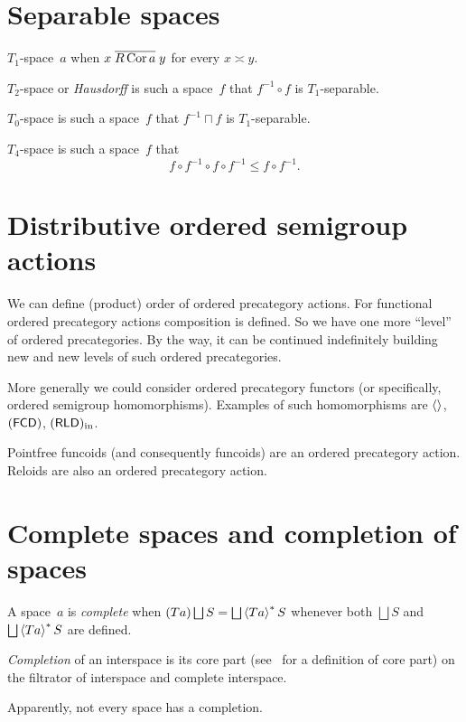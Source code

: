 \chapter{Separable spaces}

$T_1$-space~$a$ when $x\mathrel{\overline{R\operatorname{Cor} a}}y$ for every $x\asymp y$.

$T_2$-space or \emph{Hausdorff} is such a space~$f$ that $f^{-1}\circ f$ is $T_1$-separable.

$T_0$-space is such a space~$f$ that $f^{-1}\sqcap f$ is $T_1$-separable.

$T_4$-space is such a space~$f$ that \[ f\circ f^{-1}\circ f\circ f^{-1}\leq f\circ f^{-1}. \]

\chapter{Distributive ordered semigroup actions}

We can define (product) order of ordered precategory actions. For functional ordered precategory actions composition is defined. So we have one more ``level'' of ordered precategories. By the way, it can be continued indefinitely building new and new levels of such ordered precategories.

More generally we could consider ordered precategory functors (or specifically, ordered semigroup homomorphisms). Examples of such homomorphisms are $\left\langle \right\rangle$, $(\mathsf{FCD})$, $(\mathsf{RLD})_{\mathrm{in}}$.

Pointfree funcoids (and consequently funcoids) are an ordered precategory action. Reloids are also an ordered precategory action.

\chapter{Complete spaces and completion of spaces}

A space~$a$ is \emph{complete} when $(Ta)\bigsqcup S=\bigsqcup\rsupfun{Ta}S$ whenever both $\bigsqcup S$ and $\bigsqcup\rsupfun{Ta}S$ are defined.

\begin{defn}
\emph{Completion} of an interspace is its core part (see~\cite{volume-1} for a definition of core part) on the filtrator of interspace and complete interspace.
\end{defn}

\begin{note}
Apparently, not every space has a completion.
\end{note}

